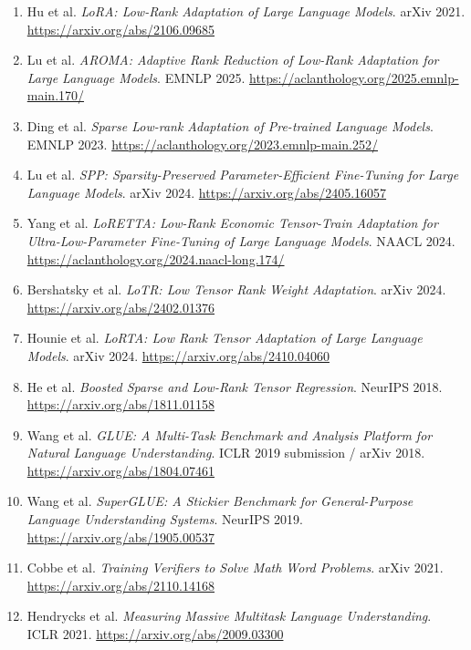 \documentclass[11pt]{article}
\begin{document}
\begin{enumerate}
\item Hu et al. \textit{LoRA: Low-Rank Adaptation of Large Language Models}. arXiv 2021. \url{https://arxiv.org/abs/2106.09685}
\item Lu et al. \textit{AROMA: Adaptive Rank Reduction of Low-Rank Adaptation for Large Language Models}. EMNLP 2025. \url{https://aclanthology.org/2025.emnlp-main.170/}
\item Ding et al. \textit{Sparse Low-rank Adaptation of Pre-trained Language Models}. EMNLP 2023. \url{https://aclanthology.org/2023.emnlp-main.252/}
\item Lu et al. \textit{SPP: Sparsity-Preserved Parameter-Efficient Fine-Tuning for Large Language Models}. arXiv 2024. \url{https://arxiv.org/abs/2405.16057}
\item Yang et al. \textit{LoRETTA: Low-Rank Economic Tensor-Train Adaptation for Ultra-Low-Parameter Fine-Tuning of Large Language Models}. NAACL 2024. \url{https://aclanthology.org/2024.naacl-long.174/}
\item Bershatsky et al. \textit{LoTR: Low Tensor Rank Weight Adaptation}. arXiv 2024. \url{https://arxiv.org/abs/2402.01376}
\item Hounie et al. \textit{LoRTA: Low Rank Tensor Adaptation of Large Language Models}. arXiv 2024. \url{https://arxiv.org/abs/2410.04060}
\item He et al. \textit{Boosted Sparse and Low-Rank Tensor Regression}. NeurIPS 2018. \url{https://arxiv.org/abs/1811.01158}
\item Wang et al. \textit{GLUE: A Multi-Task Benchmark and Analysis Platform for Natural Language Understanding}. ICLR 2019 submission / arXiv 2018. \url{https://arxiv.org/abs/1804.07461}
\item Wang et al. \textit{SuperGLUE: A Stickier Benchmark for General-Purpose Language Understanding Systems}. NeurIPS 2019. \url{https://arxiv.org/abs/1905.00537}
\item Cobbe et al. \textit{Training Verifiers to Solve Math Word Problems}. arXiv 2021. \url{https://arxiv.org/abs/2110.14168}
\item Hendrycks et al. \textit{Measuring Massive Multitask Language Understanding}. ICLR 2021. \url{https://arxiv.org/abs/2009.03300}
\end{enumerate}
\end{document}
